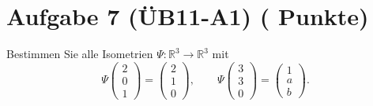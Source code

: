 \documentclass[11pt, a4paper]{article}
\newcommand{\aufgabe}[2]{%
  \section*{\Large\bfseries Aufgabe #1%
  \if\relax\detokenize{#2}\relax\else \hfill\normalfont\normalsize(#2 Punkte)\fi}%
  \vspace{-1.5ex}
}
\begin{document}
\aufgabe{7 (ÜB11-A1)}{}
Bestimmen Sie alle Isometrien $\Psi:\mathbb{R}^3\to\mathbb{R}^3$ mit
\[
\Psi\!\begin{pmatrix}2\\0\\1\end{pmatrix}=\begin{pmatrix}2\\1\\0\end{pmatrix},
\qquad
\Psi\!\begin{pmatrix}3\\3\\0\end{pmatrix}=\begin{pmatrix}1\\ a\\ b\end{pmatrix}.
\]
\end{document}
